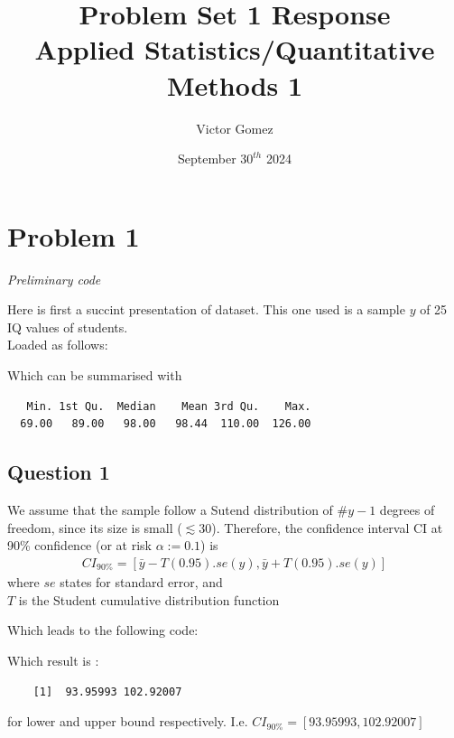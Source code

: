 \documentclass[12pt,letterpaper]{article}
\title{ Problem Set 1 Response \\ \large Applied Statistics/Quantitative Methods 1}
\date{September $30^{th}$ 2024}
\author{Victor Gomez}
\begin{document}
	\maketitle
	

\section*{Problem 1 }

\textit{Preliminary code}\\

\vspace{.25cm}

\noindent  Here is first a succint presentation of dataset.  This one used is a sample $y$ of 25 IQ values of students.\\
Loaded as follows:

  

\noindent  Which can be summarised with

  
\begin{verbatim}
   Min. 1st Qu.  Median    Mean 3rd Qu.    Max. 
  69.00   89.00   98.00   98.44  110.00  126.00
\end{verbatim}

\vspace{.5cm}

\subsection*{Question 1}

We assume that the sample follow a Sutend distribution of $\# y -1$ degrees of freedom, since its size is small ($\lesssim 30 $).
Therefore, the confidence interval CI at 90\% confidence (or at risk $\alpha :=0.1$) is 
\begin{align*}
	CI_{90\%} = [\bar{y} - T(0.95).se(y) , \bar{y} +  T(0.95).se(y) ]
\end{align*}
where $se$ states for standard error, and \\
$T$ is the Student  cumulative distribution function

Which leads to the following code:

  

Which result is :

\begin{verbatim}
	[1]  93.95993 102.92007
\end{verbatim}
for lower and upper bound respectively. I.e. $CI_{90\%} = [93.95993, 102.92007]$
\end{document}
